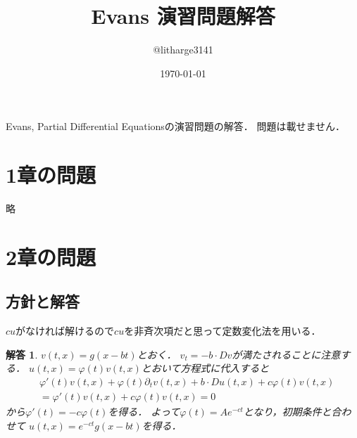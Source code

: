 \documentclass[dvipdfmx,autodetect-engine]{jsarticle}
\newtheorem*{ans}{解答}
\theoremstyle{remark}
\theoremstyle{definition}
\begin{document}
\title{Evans 演習問題解答}
\author{@litharge3141}
\date{\today}
\maketitle

\abstract
Evans, Partial Differential Equationsの演習問題の解答．
問題は載せません．

\section{1章の問題}
略
\section{2章の問題}
\subsection{方針と解答}
$cu$がなければ解けるので$cu$を非斉次項だと思って定数変化法を用いる．
\begin{ans}
    $v(t,x) = g(x-bt)$とおく．
    $v_{t} = - b \cdot Dv$が満たされることに注意する．
    $u(t,x) = \varphi(t) v(t,x)$とおいて方程式に代入すると
    \begin{align}
        &\varphi'(t) v(t,x) + \varphi(t) \partial_{t} v(t,x) + b\cdot Du(t,x) + c
        \varphi(t)v(t,x)\\
        &=\varphi'(t) v(t,x)+ c\varphi(t)v(t,x) = 0
    \end{align}
    から$\varphi'(t) = -c \varphi(t)$を得る．
    よって$\varphi(t) = Ae^{-ct}$となり，初期条件と合わせて
    $u(t,x) = e^{-ct}g(x-bt)$を得る．
\end{ans}
\end{document}
